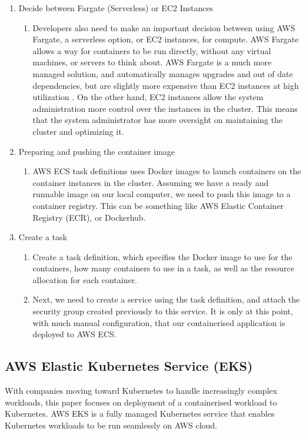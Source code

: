 \begin{enumerate}
\item Decide between Fargate (Serverless) or EC2 Instances
    \begin{enumerate}
        \item Developers also need to make an important decision between using AWS Fargate, a serverless option, or EC2 instances, for compute. AWS Fargate allows a way for containers to be run directly, without any virtual machines, or servers to think about. AWS Fargate is a much more managed solution, and automatically manages upgrades and out of date dependencies, but are slightly more expensive than EC2 instances at high utilization \cite{peck-2023}. On the other hand, EC2 instances allow the system administration more control over the instances in the cluster.  This means that the system administrator has more oversight on maintaining the cluster and optimizing it. 
    \end{enumerate}
\item Preparing and pushing the container image
    \begin{enumerate}
        \item AWS ECS task definitions uses Docker images to launch containers on the container instances in the cluster. Assuming we have a ready and runnable image on our local computer, we need to push this image to a container registry. This can be something like AWS Elastic Container Registry (ECR), or Dockerhub. 
    \end{enumerate}
\item Create a task
    \begin{enumerate}
    \item Create a task definition, which specifies the Docker image to use for the containers, how many containers to use in a task, as well as the resource allocation for each container.  
    \item Next, we need to create a service using the task definition, and attach the security group created previously to this service. It is only at this point, with much manual configuration, that our containerised application is deployed to AWS ECS.
    \end{enumerate}
\end{enumerate}

\subsection{AWS Elastic Kubernetes Service (EKS)}
With companies moving toward Kubernetes to handle increasingly complex workloads, this paper focuses on deployment of a containerised workload to Kubernetes. AWS EKS is a fully managed Kubernetes service that enables Kubernetes workloads to be run seamlessly on AWS cloud. 

